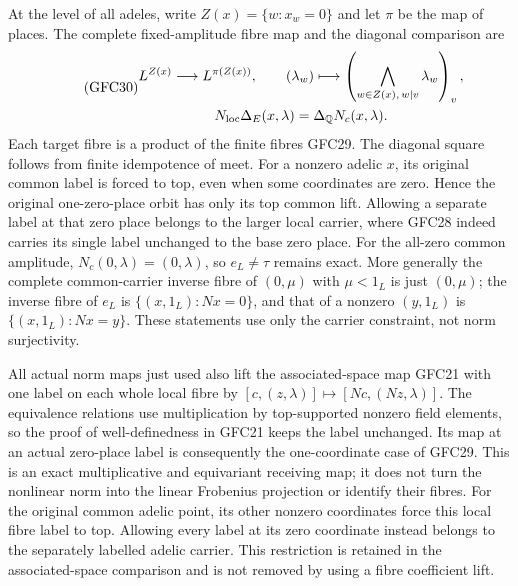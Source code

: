 At the level of all adeles, write $Z(x)=\{w:x_w=0\}$ and let
$\pi$ be the map of places. The complete fixed-amplitude fibre map
and the diagonal comparison are
\begin{equation}\tag{GFC30}
 \begin{gathered}
 L^{Z(x)}\longrightarrow L^{\pi(Z(x))},\qquad
 (\lambda_w)\longmapsto
       \left(\bigwedge_{w\in Z(x),\,w\mid v}\lambda_w\right)_v,\\
 N_{\rm loc}\Delta_E(x,\lambda)=\Delta_{\mathbb Q}N_c(x,\lambda).
 \end{gathered}
\end{equation}
Each target fibre is a product of the finite fibres GFC29.
The diagonal square follows from finite idempotence of meet.
For a nonzero adelic $x$, its original common label is forced to
top, even when some coordinates are zero. Hence the original
one-zero-place orbit has only its top common lift. Allowing a
separate label at that zero place belongs to the larger local
carrier, where GFC28 indeed carries its single label unchanged
to the base zero place. For the all-zero common amplitude,
$N_c(0,\lambda)=(0,\lambda)$, so $e_L\ne\tau$ remains exact.
More generally the complete common-carrier inverse fibre of
$(0,\mu)$ with $\mu<1_L$ is just $(0,\mu)$; the inverse fibre of
$e_L$ is $\{(x,1_L):Nx=0\}$, and that of a nonzero $(y,1_L)$
is $\{(x,1_L):Nx=y\}$. These statements use only the carrier
constraint, not norm surjectivity.

All actual norm maps just used also lift the associated-space
map GFC21 with one label on each whole local fibre by
$[c,(z,\lambda)]\mapsto[Nc,(Nz,\lambda)]$. The equivalence relations
use multiplication by top-supported nonzero field elements, so
the proof of well-definedness in GFC21 keeps the label unchanged.
Its map at an actual zero-place label is consequently the
one-coordinate case of GFC29. This is an exact multiplicative
and equivariant receiving map; it does not turn the nonlinear
norm into the linear Frobenius projection or identify their fibres.
For the original common adelic point, its other nonzero coordinates
force this local fibre label to top. Allowing every label at its
zero coordinate instead belongs to the separately labelled adelic
carrier. This restriction is retained in the associated-space
comparison and is not removed by using a fibre coefficient lift.

